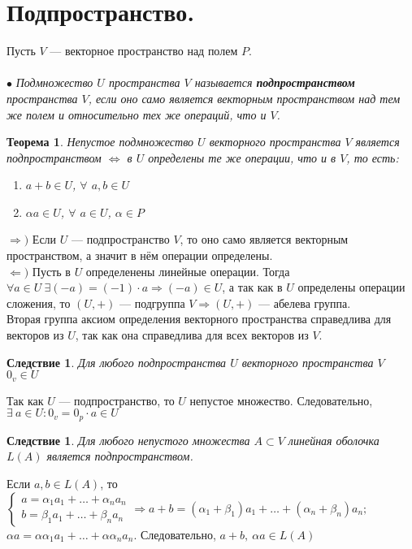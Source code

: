 \section{Подпространство.}
Пусть $V$ --- векторное пространство над полем $P$.\\\\
$\bullet$ \textit{Подмножество $U$ пространства $V$ называется \textbf{подпространством} пространства $V$, если оно само является векторным пространством над тем же полем и относительно тех же операций, что и $V$.}
\newtheorem*{th5_1}{Теорема}\begin{th5_1}
	Непустое подмножество $U$ векторного пространства $V$ является подпространством $\Longleftrightarrow$ в $U$ определены те же операции, что и в $V$, то есть:
	\begin{enumerate}
		\item  $a + b \in U$, $\forall$ $a, b \in U$
		\item $\alpha a \in U$, $\forall$ $a \in U$, $\alpha \in P$
\end{enumerate}\end{th5_1}
\begin{Proof}
	$\Rightarrow)$ Если $U$ --- подпространство $V$, то оно само является векторным пространством, а значит в нём операции определены.\\
	$\Leftarrow)$ Пусть в $U$ определенены линейные операции. Тогда $\forall a\in U\ \exists (-a) = (-1)\cdot a\Rightarrow(-a)\in U$, а так как в $U$ определены операции сложения, то $(U,+)$ --- подгруппа $V \Rightarrow (U, +)$ --- абелева группа.\\
	Вторая группа аксиом определения векторного пространства справедлива для векторов из $U$, так как она справедлива для всех векторов из $V$.
\end{Proof}
\newtheorem*{cor5_1}{Следствие}\begin{cor5_1} Для любого подпространства $U$ векторного пространства $V$ $0_v\in U$
\end{cor5_1}
\begin{Proof}
	Так как $U$ --- подпространство, то $U$ непустое множество. Следовательно, $\exists\ a \in U:0_v = 0_p \cdot a \in U$
\end{Proof}
\newtheorem*{cor5_2}{Следствие}\begin{cor5_2}Для любого непустого множества $A\subset V$ линейная оболочка $L(A)$ является подпространством.\end{cor5_2}
\begin{Proof}
	Если $a, b \in L(A)$, то\\ $\begin{cases}
		a = \alpha_1 a_1 + \ldots + \alpha_n a_n\\
		b = \beta_1 a_1 + \ldots + \beta_n a_n
	\end{cases} \Rightarrow a+b = (\alpha_1 + \beta_1) a_1 + \ldots + (\alpha_n + \beta_n) a_n;$\\
	$\alpha a = \alpha \alpha_1 a_1 + \ldots + \alpha \alpha_n a_n$. Следовательно, $a+b,\ \alpha a \in L(A)$
\end{Proof}
